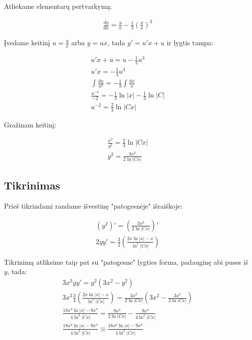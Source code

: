 \documentclass[11pt]{article}
\begin{document}
Atliekame elementarų pertvarkymą:

\begin{equation}
\begin{split}
\frac{dy}{dx}=\frac{y}{x}-\frac{1}{3}\left(\frac{y}{x}\right)^3
\end{split}
\end{equation}

Įvedame keitinį $u=\frac{y}{x}$ arba $y=ux$, tada $y'=u'x+u$ ir lygtis tampa:

\begin{equation}
\begin{split}
u'x+u=u-\frac{1}{3}u^3\\
u'x=-\frac{1}{3}u^3\\
\int\frac{du}{u^3}=-\frac{1}{3}\int\frac{dx}{x}\\
\frac{u^{-2}}{-2}=-\frac{1}{3}\ln|x|-\frac{1}{3}\ln|C|\\
u^{-2}=\frac{2}{3}\ln|Cx|
\end{split}
\end{equation}

Gražinam keitinį:

\begin{equation}
\begin{split}
\frac{x^2}{y^2}=\frac{2}{3}\ln|Cx|\\
y^2=\frac{3x^2}{2\ln|Cx|}
\end{split}
\end{equation}

\subsection{Tikrinimas}

Prieš tikrindami randame išvestinę "patogesnėje" išraiškoje:

\begin{equation}
\begin{split}
(y^2)'=\left(\frac{3x^2}{2\ln|Cx|}\right)'\\
2yy'=\frac{3}{2}\left(\frac{2x\ln|x|-x}{\ln^2|Cx|}\right)
\end{split}
\end{equation}

Tikrinimą atliksime taip pat su "patogesne" lygties forma, padauginę abi puses iš $y$, tada:
\begin{equation}
\begin{split}
3x^3yy'=y^2(3x^2-y^2)\\
3x^3\frac{3}{4}\left(\frac{2x\ln|x|-x}{\ln^2|Cx|}\right)=\frac{3x^2}{2\ln|Cx|}\left(3x^2-\frac{3x^2}{2\ln|Cx|}\right)\\
\frac{18x^4\ln|x|-9x^4}{4\ln^2|Cx|}=\frac{9x^2}{2\ln|Cx|}-\frac{9x^2}{4\ln^2|Cx|}\\
\frac{18x^4\ln|x|-9x^4}{4\ln^2|Cx|}\equiv\frac{18x^4\ln|x|-9x^4}{4\ln^2|Cx|}
\end{split}
\end{equation}
\end{document}
